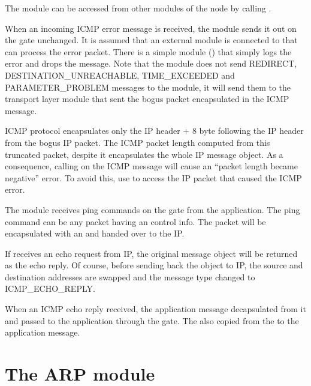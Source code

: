 The  module can be accessed from other modules of the node by calling
.

When an incoming ICMP error message is received, the  module
sends it out on the  gate unchanged. It is assumed that an
external module is connected to  that can process the error
packet. There is a simple module () that simply
logs the error and drops the message. Note that the  module
does not send REDIRECT, DESTINATION\_UNREACHABLE,
TIME\_EXCEEDED and PARAMETER\_PROBLEM messages to the  module,
it will send them to the transport layer module that sent the bogus
packet encapsulated in the ICMP message.
\begin{note}
ICMP protocol encapsulates only the IP header + 8 byte following the IP header
from the bogus IP packet. The ICMP packet length computed from this truncated
packet, despite it encapsulates the whole IP message object.
As a consequence, calling  on the ICMP message
will cause an ``packet length became negative'' error. To avoid this,
use  to access the IP packet that caused the ICMP
error. 
\end{note}

The  module receives ping commands on the 
gate from the application. The ping command can be any packet
having an  control info. The packet
will be encapsulated with an  and
handed over to the IP.

If  receives an echo request from IP, the original
message object will be returned as the echo reply. Of course,
before sending back the object to IP, the source and destination
addresses are swapped and the message type changed to ICMP\_ECHO\_REPLY.

When an ICMP echo reply received, the application message decapsulated
from it and passed to the application through the  gate.
The  also copied from the 
to the application message. 



\section{The ARP module}

